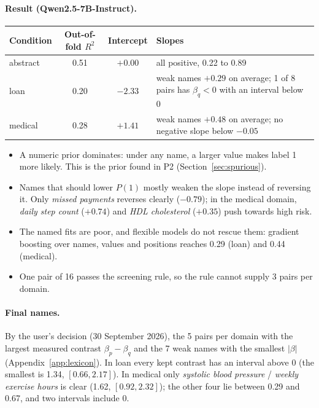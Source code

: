 \documentclass[11pt,a4paper]{article}
\newcommand{\1}{\mathbf{1}}
\theoremstyle{plain}
\theoremstyle{definition}
\theoremstyle{remark}
\begin{document}
\paragraph{Result (Qwen2.5-7B-Instruct).}
\begin{center}
{\small
\begin{tabular}{lccL{8.2cm}}
\toprule
\textbf{Condition} & \textbf{Out-of-fold $R^2$} & \textbf{Intercept} & \textbf{Slopes} \\
\midrule
abstract & 0.51 & $+0.00$ & all positive, 0.22 to 0.89 \\
loan & 0.20 & $-2.33$ & weak names $+0.29$ on average; 1 of 8 pairs has $\beta_q < 0$ with an interval below 0 \\
medical & 0.28 & $+1.41$ & weak names $+0.48$ on average; no negative slope below $-0.05$ \\
\bottomrule
\end{tabular}}
\end{center}
\begin{itemize}[nosep]
  \item A numeric prior dominates: under any name, a larger value makes
        label 1 more likely. This is the prior found in P2
        (Section~\ref{sec:spurious}).
  \item Names that should lower $P(1)$ mostly weaken the slope instead of
        reversing it. Only \emph{missed payments} reverses clearly
        ($-0.79$); in the medical domain, \emph{daily step count} ($+0.74$)
        and \emph{HDL cholesterol} ($+0.35$) push towards high risk.
  \item The named fits are poor, and flexible models do not rescue them:
        gradient boosting over names, values and positions reaches 0.29
        (loan) and 0.44 (medical).
  \item One pair of 16 passes the screening rule, so the rule cannot supply
        3 pairs per domain.
\end{itemize}

\paragraph{Final names.} By the user's decision (30 September 2026), the 5
pairs per domain with the largest measured contrast $\beta_p - \beta_q$ and
the 7 weak names with the smallest $|\beta|$ (Appendix~\ref{app:lexicon}).
In loan every kept contrast has an interval above 0 (the smallest is 1.34,
$[0.66, 2.17]$). In medical only \emph{systolic blood pressure} /
\emph{weekly exercise hours} is clear (1.62, $[0.92, 2.32]$); the other
four lie between 0.29 and 0.67, and two intervals include 0.
\end{document}
